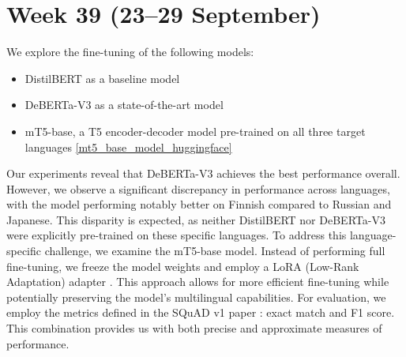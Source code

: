 \documentclass[11pt]{article}
\begin{document}
\section{Week 39 (23--29 September)}
\label{sec:week39}

We explore the fine-tuning of the following models:
\begin{itemize}
    \item DistilBERT as a baseline model
    \item DeBERTa-V3 as a state-of-the-art model
    \item mT5-base, a T5 encoder-decoder model pre-trained on all three target languages \ref{mt5_base_model_huggingface}
\end{itemize}

Our experiments reveal that DeBERTa-V3 achieves the best performance overall. However, we observe a significant discrepancy in performance across languages, with the model performing notably better on Finnish compared to Russian and Japanese. This disparity is expected, as neither DistilBERT nor DeBERTa-V3 were explicitly pre-trained on these specific languages.
To address this language-specific challenge, we examine the mT5-base model. Instead of performing full fine-tuning, we freeze the model weights and employ a LoRA (Low-Rank Adaptation) adapter \cite{hu2021loralowrankadaptationlarge}. This approach allows for more efficient fine-tuning while potentially preserving the model's multilingual capabilities.
For evaluation, we employ the metrics defined in the SQuAD v1 paper \cite{rajpurkar-etal-2018-know}: exact match and F1 score. This combination provides us with both precise and approximate measures of performance.
\end{document}
